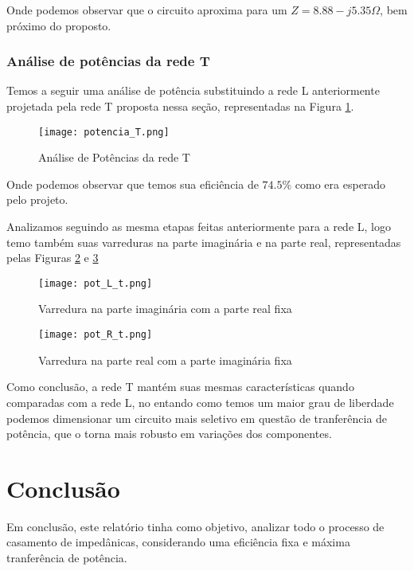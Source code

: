 \documentclass[a4paper,12pt]{proc}
\begin{document}
\noindent Onde podemos observar que o circuito aproxima para um $Z = 8.88 - j5.35 \Omega$, bem próximo do proposto.

\subsubsection{Análise de potências da rede T}

Temos a seguir uma análise de potência substituindo a rede L anteriormente projetada pela rede T proposta nessa seção, representadas na Figura \ref{pot_T}.

\begin{figure}[htbp]
    \centering
    \texttt{[image: potencia\_T.png]}
    \caption{Análise de Potências da rede T}
    \label{pot_T}
\end{figure}

\noindent Onde podemos observar que temos sua eficiência de $74.5\%$ como era esperado pelo projeto.

\singlespacing

\noindent Analizamos seguindo as mesma etapas feitas anteriormente para a rede L, logo temo também suas varreduras na parte imaginária e na parte real, representadas pelas Figuras \ref{imag_t} e \ref{real_t}

\begin{figure}[htbp]
    \centering
    \texttt{[image: pot\_L\_t.png]}
    \caption{Varredura na parte imaginária com a parte real fixa}
    \label{imag_t}
\end{figure}


\begin{figure}[htbp]
    \centering
    \texttt{[image: pot\_R\_t.png]}
    \caption{Varredura na parte real com a parte imaginária fixa}
    \label{real_t}
\end{figure}

\singlespacing

\noindent Como conclusão, a rede T mantém suas mesmas características quando comparadas com a rede L, no entando como temos um maior grau de liberdade podemos dimensionar um circuito mais seletivo em questão de tranferência de potência, que o torna mais robusto em variações dos componentes.

\section{Conclusão}

Em conclusão, este relatório tinha como objetivo, analizar todo o processo de casamento de impedânicas, considerando uma eficiência fixa e máxima tranferência de potência. 
\end{document}

